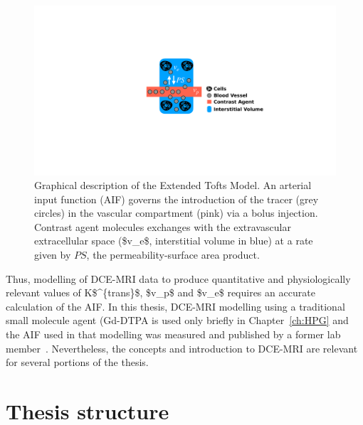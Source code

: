 \begin{figure}[htbp]
   \centering
   \includegraphics[width=\textwidth]{intro/intro-images/XTofts.pdf}
   \caption[Extended Tofts Model]{Graphical description of the Extended Tofts Model. An arterial input function (\acs{AIF}) governs the introduction of the tracer (grey circles) in the vascular compartment (pink) via a bolus injection. Contrast agent molecules exchanges with the extravascular extracellular space (\acs{$v_e$}, interstitial volume in blue) at a rate given by $PS$, the permeability-surface area product.}
   \label{XTofts}
\end{figure}

Thus, modelling of \acs{DCE-MRI} data to produce quantitative and physiologically relevant values of \acs{K$^{trans}$}, \acs{$v_p$} and \acs{$v_e$} requires an accurate calculation of the \acs{AIF}.
In this thesis, \acs{DCE-MRI} modelling using a traditional small molecule agent (\acs{Gd-DTPA} is used only briefly in Chapter~\ref{ch:HPG} and the \acs{AIF} used in that modelling was measured and published by a former lab member~\cite{Moroz:2013ee}.
Nevertheless, the concepts and introduction to \acs{DCE-MRI} are relevant for several portions of the thesis. 

\section{Thesis structure}

